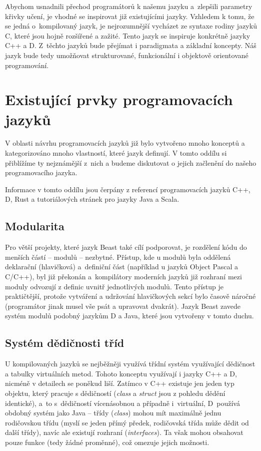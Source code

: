Abychom usnadnili přechod programátorů k našemu jazyku a~zlepšili parametry křivky učení, je vhodné se inspirovat již existujícími jazyky. Vzhledem k tomu, že se jedná o~kompilovaný jazyk, je nejrozumnější vycházet ze syntaxe rodiny jazyků C, které jsou hojně rozšířené a zažité. Tento jazyk se inspiruje konkrétně jazyky C++ a D. Z~těchto jazyků bude přejímat i paradigmata a základní koncepty. Náš jazyk bude tedy umožňovat strukturované, funkcionální i objektově orientované programování.

\section{Existující prvky programovacích jazyků}
V oblasti návrhu programovacích jazyků již bylo vytvořeno mnoho konceptů a kategorizováno mnoho vlastností, které jazyk definují. V tomto oddílu si přiblížíme ty nejznámější z~nich a budeme diskutovat o jejich začlenění do našeho programovacího jazyka.

Informace v tomto oddílu jsou čerpány z referencí programovacích jazyků C++\cite{CppRef}, D\cite{DSpec}, Rust\cite{RustRef} a tutoriálových stránek pro jazyky Java\cite{JavaTut} a Scala\cite{ScalaTut}.

\subsection{Modularita}
Pro větší projekty, které jazyk Beast také cílí podporovat, je rozdělení kódu do menších částí -- modulů -- nezbytné. Přístup, kde u modulů byla oddělená deklarační (hlavičková) a~definiční část (například u jazyků Object Pascal a C/C++), byl již překonán a~kompilátory moderních jazyků již rozhraní mezi moduly odvozují z definic uvnitř jednotlivých modulů. Tento přístup je praktičtější, protože vytváření a udržování hlavičkových sekcí bylo časově náročné (programátor jinak musel vše psát a upravovat dvakrát). Jazyk Beast zavede systém modulů podobný jazykům D a Java, které jsou vytvořeny v tomto duchu.

\subsection{Systém dědičnosti tříd} U kompilovaných jazyků se nejběžněji využívá třídní systém využívající dědičnost a tabulky virtuálních metod. Tohoto konceptu využívají i jazyky C++ a D, nicméně v detailech se poněkud liší. Zatímco v C++ existuje jen jeden typ objektu, který pracuje s dědičností (\textit{class} a \textit{struct} jsou z pohledu dědění identické), a~to s~dědičností vícenásobnou a případně i~virtuální, D~používá obdobný systém jako Java -- třídy (\textit{class}) mohou mít maximálně jednu rodičovskou třídu (myslí se jeden přímý předek, rodičovská třída může dědit od další třídy), navíc ale existují rozhraní (\textit{interfaces}). Ta však mohou obsahovat pouze funkce (tedy žádné proměnné), což omezuje jejich možnosti.

